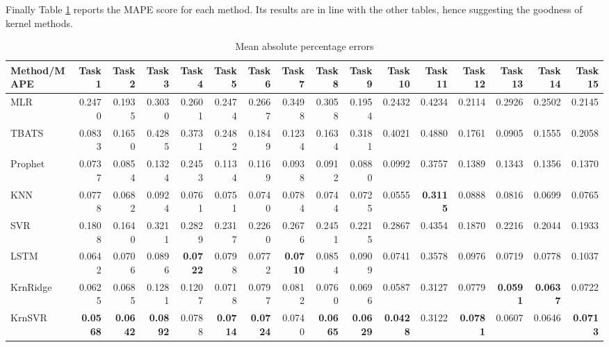 Finally Table \ref{tab:point_MAPE} reports the MAPE score for each method. Its results are in line with the other tables, hence suggesting the goodness of kernel methods.
\begin{table}[!ht]
    \caption{Mean absolute percentage errors}
    \label{tab:point_MAPE}
    \begin{adjustbox}{width=\textwidth}
        \begin{tabular}{lrrrrrrrrrrrrrrr}
            \toprule
             Method/MAPE & Task 1 & Task 2 & Task 3 & Task 4 & Task 5 & Task 6 & Task 7 & Task 8 & Task 9 & Task 10 & Task 11 & Task 12 & Task 13 & Task 14 & Task 15 \\
            \midrule
            MLR & 0.2470 & 0.1935 & 0.3030 & 0.2601 & 0.2474 & 0.2667 & 0.3498 & 0.3058 & 0.1954 & 0.2432 & 0.4234 & 0.2114 & 0.2926 & 0.2502 & 0.2145 \\
            TBATS & 0.0833 & 0.1650 & 0.4285 & 0.3731 & 0.2482 & 0.1849 & 0.1234 & 0.1634 & 0.3181 & 0.4021 & 0.4880 & 0.1761 & 0.0905 & 0.1555 & 0.2058 \\
            Prophet & 0.0737 & 0.0854 & 0.1324 & 0.2453 & 0.1134 & 0.1169 & 0.0938 & 0.0912 & 0.0880 & 0.0992 & 0.3757 & 0.1389 & 0.1343 & 0.1356 & 0.1370 \\
            KNN & 0.0778 & 0.0682 & 0.0924 & 0.0761 & 0.0751 & 0.0740 & 0.0784 & 0.0744 & 0.0725 & 0.0555 & \textbf{0.3115} & 0.0888 & 0.0816 & 0.0699 & 0.0765 \\
            SVR & 0.1808 & 0.1640 & 0.3211 & 0.2829 & 0.2317 & 0.2260 & 0.2676 & 0.2451 & 0.2215 & 0.2867 & 0.4354 & 0.1870 & 0.2216 & 0.2044 & 0.1933 \\
            LSTM & 0.0642 & 0.0706 & 0.0896 & \textbf{0.0722} & 0.0798 & 0.0772 & \textbf{0.0710} & 0.0854 & 0.0909 & 0.0741 & 0.3578 & 0.0976 & 0.0719 & 0.0778 & 0.1037 \\
            KrnRidge & 0.0625 & 0.0685 & 0.1281 & 0.1207 & 0.0718 & 0.0797 & 0.0812 & 0.0760 & 0.0696 & 0.0587 & 0.3127 & 0.0779 & \textbf{0.0591} & \textbf{0.0637} & 0.0722 \\
            KrnSVR & \textbf{0.0568} & \textbf{0.0642} & \textbf{0.0892} & 0.0788 & \textbf{0.0714} & \textbf{0.0724} & 0.0740 & \textbf{0.0665} & \textbf{0.0629} & \textbf{0.0428} & 0.3122 & \textbf{0.0781} & 0.0607 & 0.0646 & \textbf{0.0713} \\
            \bottomrule
            \end{tabular}            
    \end{adjustbox}
\end{table}

